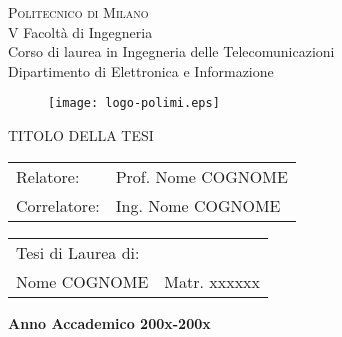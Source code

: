 \documentclass[a4paper,12pt,twoside]{report}
\newlength{\defbaselineskip}
\newcommand{\setlinespacing}[1]%
           {\setlength{\baselineskip}{#1 \defbaselineskip}}
\begin{document}

\thispagestyle{empty}
\enlargethispage{60mm}
\begin{center}
\Large{\textsc{Politecnico di Milano}}\\
\large{V Facolt\`a di Ingegneria}\\
\large{Corso di laurea in Ingegneria delle Telecomunicazioni}\\
\large{Dipartimento di Elettronica e Informazione}\\
\vspace{7mm}
\begin{figure}[h]
\begin{center}
\texttt{[image: logo-polimi.eps]}
\end{center}
\end{figure}
\vspace{2mm}

\begin{LARGE}
TITOLO DELLA TESI
\end{LARGE}
\vspace{25mm}

\begin{flushleft}
\begin{tabular}{l l }
Relatore:    & Prof. Nome COGNOME\\
Correlatore: & Ing. Nome COGNOME\\
\end{tabular}
\end{flushleft}
\vspace{25mm}

\begin{flushright}
\begin{tabular}{l l }
Tesi di Laurea di: & \\
Nome COGNOME & Matr. xxxxxx
\end{tabular}
\end{flushright}
\vspace{43mm}
{\large{\bf Anno Accademico 200x-200x}}
\end{center}



\clearpage
\newpage


\setlinespacing{1.5}


\end{document}
